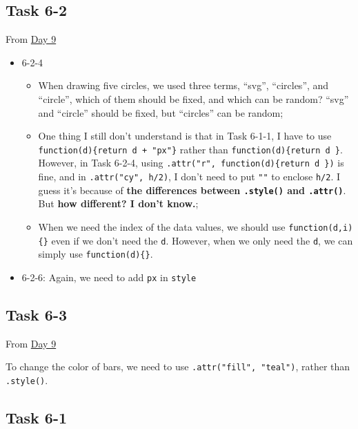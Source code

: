\documentclass[
]{book}
\begin{document}
\hypertarget{task-6-2}{%
\subsection{Task 6-2}\label{task-6-2}}

From \href{https://observablehq.com/@hongtaoh/day-nine-spet-2-2020}{Day 9}

\begin{itemize}
\item
  6-2-4

  \begin{itemize}
  \item
    When drawing five circles, we used three terms, ``svg'', ``circles'', and ``circle'', which of them should be fixed, and which can be random? ``svg'' and ``circle'' should be fixed, but ``circles'' can be random;
  \item
    One thing I still don't understand is that in Task 6-1-1, I have to use \texttt{function(d)\{return\ d\ +\ "px"\}} rather than \texttt{function(d)\{return\ d\ \}}. However, in Task 6-2-4, using \texttt{.attr("r",\ function(d)\{return\ d\ \})} is fine, and in \texttt{.attr("cy",\ h/2)}, I don't need to put \texttt{""} to enclose \texttt{h/2}. I guess it's because of \textbf{the differences between \texttt{.style()} and \texttt{.attr()}}. But \textbf{how different? I don't know.};
  \item
    When we need the index of the data values, we should use \texttt{function(d,i)\{\}} even if we don't need the \texttt{d}. However, when we only need the \texttt{d}, we can simply use \texttt{function(d)\{\}}.
  \end{itemize}
\item
  6-2-6: Again, we need to add \texttt{px} in \texttt{style}
\end{itemize}

\hypertarget{task-6-3}{%
\subsection{Task 6-3}\label{task-6-3}}

From \href{https://observablehq.com/@hongtaoh/day-nine-spet-2-2020}{Day 9}

To change the color of bars, we need to use \texttt{.attr("fill",\ "teal")}, rather than \texttt{.style()}.

\hypertarget{task-6-1}{%
\subsection{Task 6-1}\label{task-6-1}}
\end{document}
